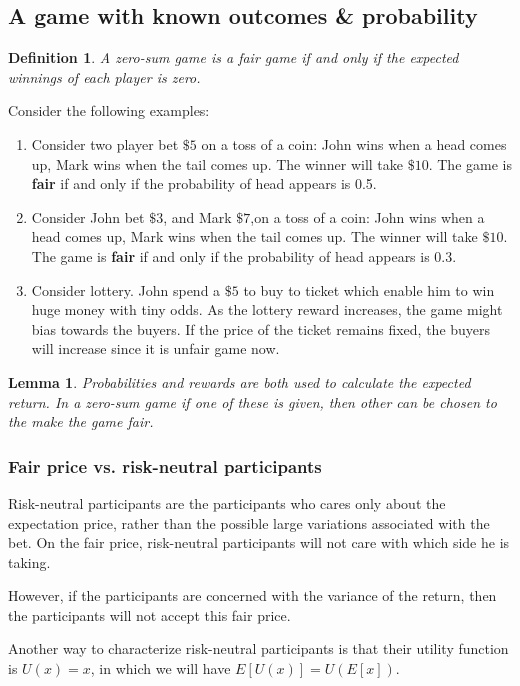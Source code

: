 \documentclass[a4paper,13pt]{report}
\newtheorem{lemma}[theorem]{Lemma}
\newtheorem*{definition}{Definition}
\begin{document}
\subsection{A game with known outcomes \& probability}
\begin{definition}
A zero-sum game is a fair game if and only if the expected winnings of each player is zero. \cite{dineen2013probability}
\end{definition}
Consider the following examples:
\begin{enumerate}
    \item Consider two player bet $\$5$ on a toss of a coin: John wins when a head comes up, Mark wins when the tail comes up. The winner will take $\$10$. The game is \textbf{fair} if and only if the probability of head appears is 0.5. 
    \item Consider John bet $\$3$, and Mark $\$7$,on a toss of a coin: John wins when a head comes up, Mark wins when the tail comes up. The winner will take $\$10$. The game is \textbf{fair} if and only if the probability of head appears is 0.3.
    \item Consider lottery. John spend a $\$5$ to buy to ticket which enable him to win huge money with tiny odds. As the lottery reward increases, the game might bias towards the buyers. If the price of the ticket remains fixed, the buyers will increase since it is unfair game now.
\end{enumerate}

\begin{lemma}
Probabilities and rewards are both used to calculate the expected return. In a zero-sum game if one of these is given, then other can be chosen to the make the game fair. \cite{dineen2013probability}
\end{lemma}

\subsubsection{Fair price vs. risk-neutral participants}
Risk-neutral participants are the participants who cares only about the expectation price, rather than the possible large variations associated with the bet. On the fair price, risk-neutral participants will not care with which side he is taking.  

However, if the participants are concerned with the variance of the return, then the participants will not accept this fair price. 

Another way to characterize risk-neutral participants is that their utility function is $U(x)=x$, in which we will have $E[U(x)]=U(E[x])$.
\end{document}
